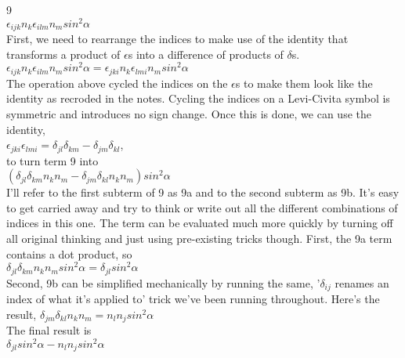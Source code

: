 \documentclass[prb,preprint]
{revtex4-1}
\begin{document}
9\\
$\epsilon_{ijk} n_k \epsilon_{ilm} n_m sin^2 \alpha$\\
First, we need to rearrange the indices to make use of the identity that transforms a product of $\epsilon$s into a difference of products of $\delta$s.\\
$\epsilon_{ijk} n_k \epsilon_{ilm} n_m sin^2 \alpha = \epsilon_{jki} n_k \epsilon_{lmi} n_m sin^2 \alpha$\\
The operation above cycled the indices on the $\epsilon$s to make them look like the identity as recroded in the notes.  Cycling the indices on a Levi-Civita symbol is symmetric and introduces no sign change.  Once this is done, we can use the identity, \\
$\epsilon_{jki} \epsilon_{lmi} = \delta_{jl} \delta_{km} - \delta_{jm} \delta_{kl}$, \\
to turn term 9 into \\
$\left(\delta_{jl} \delta_{km}n_k n_m - \delta_{jm} \delta_{kl}n_k n_m\right) sin^2 \alpha$\\
I'll refer to the first subterm of 9 as 9a and to the second subterm as 9b.  It's easy to get carried away and try to think or write out all the different combinations of indices in this one.  The term can be evaluated much more quickly by turning off all original thinking and just using pre-existing tricks though.  First, the 9a term contains a dot product, so \\
$\delta_{jl} \delta_{km}n_k n_m  sin^2 \alpha = \delta_{jl} sin^2 \alpha$\\
Second, 9b can be simplified mechanically by running the same, '$\delta_{ij}$ renames an index of what it's applied to' trick we've been running throughout.  Here's the result,
$\delta_{jm} \delta_{kl}n_k n_m = n_l n_j sin^2 \alpha$\\
The final result is \\
$\delta_{jl} sin^2 \alpha - n_l n_j sin^2 \alpha$\\\\
\end{document}
